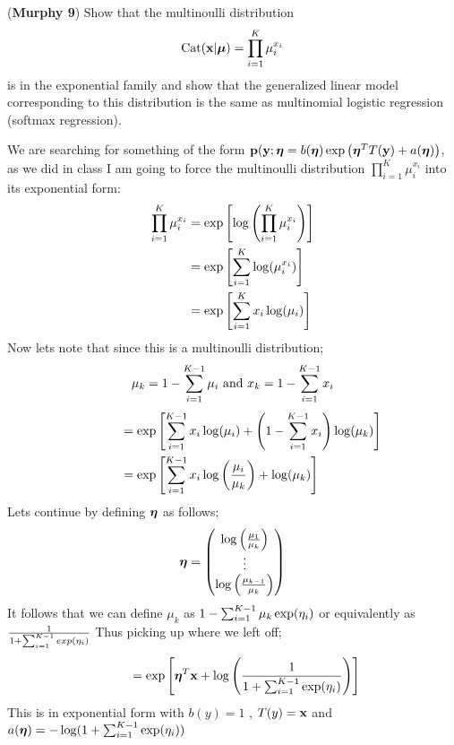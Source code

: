 \documentclass[12pt,letterpaper,fleqn]{hmcpset}
\begin{document}
\begin{problem}[2]
(\textbf{Murphy 9}) Show that the multinoulli distribution
\[
    \text{Cat}({\bf x}|\hbox{\boldmath$\mu$}) = \prod_{i=1}^K \mu_i^{x_i}
\]
is in the exponential family and show that the generalized linear model
corresponding to this distribution is the same as multinomial logistic
regression (softmax regression).
\end{problem}
\begin{solution}
We are searching for something of the form ${\bf p}({\bf y};\boldsymbol{\eta}=b(\boldsymbol{\eta})\exp \left(\boldsymbol{\eta}^TT({\bf y})+a(\boldsymbol{\eta})\right)$, as we did in class I am going to force the multinoulli distribution $\prod_{i=1}^K \mu_i^{x_i}$ into its exponential form:
\begin{align}
\prod_{i=1}^K \mu_i^{x_i} &= \exp\left[\log\left(\prod_{i=1}^K \mu_i^{x_i}\right)\right]\\
&=\exp\left[\sum_{i=1}^K\log(\mu_i^{x_i})\right]\\
&= \exp \left[\sum_{i=1}^K x_i\log(\mu_i)\right]
\end{align}
Now lets note that since this is a multinoulli distribution; 
$$\mu_k = 1-\sum_{i=1}^{K-1}\mu_i \text{ and } x_k = 1- \sum_{i=1}^{K-1} x_i$$
\begin{align}
\phantom{\prod_{i=1}^K \mu_i^{x_i} }&= \exp\left[\sumkL x_i\log(\mu_i)+\left(1-\sumkL x_i\right)\log (\mu_k)\right]\\
&=\exp\left[\sumkL x_i \log\left(\frac{\mu_i}{\mu_k}\right)+\log (\mu_k)\right]
\end{align}
Lets continue by defining $\boldsymbol{\eta}$ as follows; 
$$ \boldsymbol{\eta} = \begin{pmatrix}
\log\left( \frac{\mu_1}{\mu_k}\right)\\
\vdots\\
\log\left( \frac{\mu_{k-1}}{\mu_k}\right)
\end{pmatrix}
$$
It follows that we can define $\mu_k$ as $1-\sum_{i=1}^{K-1}\mu_k\exp(\eta_i) $ or equivalently as $ \frac{1}{1 +\sum_{i=1}^{K-1} exp(\eta_i)} $
Thus picking up where we left off; 
\begin{align}
\phantom{\prod_{i=1}^K \mu_i^{x_i} }&= \exp\left[\eeta^T\xx + \log\left(\frac{1}{1 +\sumkL \exp(\eta_i)}\right)\right]
\end{align}
This is in exponential form with $b(y)  =1 $ , $T(y) = {\bf x}$ and $a(\boldsymbol{\eta}) = -\log( 1 +\sum_{i=1}^{K-1} \exp(\eta_i))$
\end{solution}
\newpage
\end{document}
